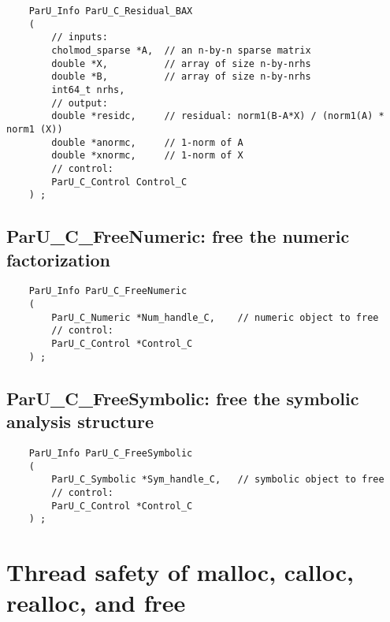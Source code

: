 \documentclass[12pt]{article}
\begin{document}
    {\footnotesize
    \begin{verbatim}
    ParU_Info ParU_C_Residual_BAX
    (
        // inputs:
        cholmod_sparse *A,  // an n-by-n sparse matrix
        double *X,          // array of size n-by-nrhs
        double *B,          // array of size n-by-nrhs
        int64_t nrhs,
        // output:
        double *residc,     // residual: norm1(B-A*X) / (norm1(A) * norm1 (X))
        double *anormc,     // 1-norm of A
        double *xnormc,     // 1-norm of X
        // control:
        ParU_C_Control Control_C
    ) ; \end{verbatim} }

\subsection{{\sf ParU\_C\_FreeNumeric}: free the numeric factorization}

    {\footnotesize
    \begin{verbatim}
    ParU_Info ParU_C_FreeNumeric
    (
        ParU_C_Numeric *Num_handle_C,    // numeric object to free
        // control:
        ParU_C_Control *Control_C
    ) ; \end{verbatim} }

\subsection{{\sf ParU\_C\_FreeSymbolic}: free the symbolic analysis structure}

    {\footnotesize
    \begin{verbatim}
    ParU_Info ParU_C_FreeSymbolic
    (
        ParU_C_Symbolic *Sym_handle_C,   // symbolic object to free
        // control:
        ParU_C_Control *Control_C
    ) ; \end{verbatim} }

\section{Thread safety of {\sf malloc}, {\sf calloc}, {\sf realloc}, and
{\sf free}}
\end{document}
